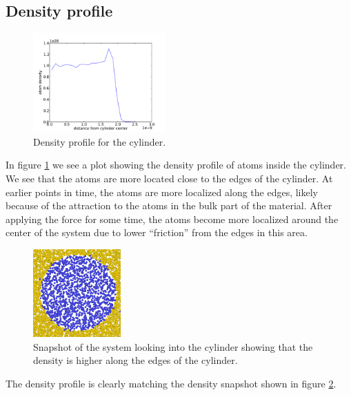 \documentclass[reprint,floatfix,amsmath,amssymb,aps,pra]{revtex4-1}
\begin{document}
\subsection{Density profile}

\begin{figure}
  \centering
  \includegraphics[width=0.45\textwidth]{../analysis/1j-cylinder-force/runs/2013-04-05_201107/atom-density.pdf}
  \caption{Density profile for the cylinder.}
  \label{fig:density-profile}
\end{figure}

In figure \ref{fig:density-profile} we see a plot showing the density profile of atoms inside the cylinder. We see that the atoms are more located close to the edges of the cylinder. At earlier points in time, the atoms are more localized along the edges, likely because of the attraction to the atoms in the bulk part of the material. After applying the force for some time, the atoms become more localized around the center of the system due to lower ``friction'' from the edges in this area.

\begin{figure}
  \centering
  \includegraphics[width=0.30\textwidth]{../analysis/1j-cylinder-force/runs/2013-04-05_201107/density-snapshot.png}
  \caption{Snapshot of the system looking into the cylinder showing that the density is higher along the edges of the cylinder.}
  \label{fig:density-snapshot}
\end{figure}

The density profile is clearly matching the density snapshot shown in figure \ref{fig:density-snapshot}.
\end{document}
